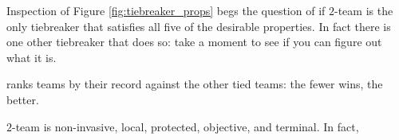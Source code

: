 {    Inspection of Figure \ref{fig:tiebreaker_props} begs the question of if $2$-team  is the only tiebreaker that satisfies all five of the desirable properties. In fact there is one other tiebreaker that does so: take a moment to see if you can figure out what it is.

    \begin{definition}{}{}
         ranks teams by their record against the other tied teams: the fewer wins, the better.
    \end{definition}

    $2$-team  is non-invasive, local, protected, objective, and terminal. In fact,




}